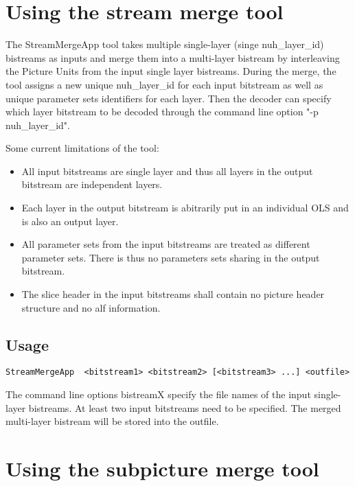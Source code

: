 \documentclass[a4paper,11pt]{jvetdoc}
\begin{document}
\section{Using the stream merge tool}
\label{sec:stream-merge-tool}

The StreamMergeApp tool takes multiple single-layer (singe nuh_layer_id) bistreams 
as inputs and merge them into a multi-layer bistream by interleaving the Picture Units
from the input single layer bistreams. During the merge, the tool assigns a new unique
nuh_layer_id for each input bitstream as well as unique parameter sets identifiers for each layer.
Then the decoder can specify which layer bitstream to be decoded through the command line option "-p nuh_layer_id".

Some current limitations of the tool:
\begin{itemize}
\item All input bitstreams are single layer and thus all layers in the output bitstream are independent layers.
\item Each layer in the output bitstream is abitrarily put in an individual OLS and is also an output layer.
\item All parameter sets from the input bitstreams are treated as different parameter sets. There is thus no parameters sets sharing in the output bitstream.
\item The slice header in the input bitstreams shall contain no picture header structure and no alf information.
\end{itemize}


\subsection{Usage}
\label{sec:stream-merge-usage}

\begin{verbatim}
StreamMergeApp 	<bitstream1> <bitstream2> [<bitstream3> ...] <outfile>
\end{verbatim}

The command line options bistreamX specify the file names of the input single-layer 
bistreams. At least two input bitstreams need to be specified. The merged multi-layer 
bistream will be stored into the outfile.




\section{Using the subpicture merge tool}
\label{sec:subpicture-merge-tool}
\end{document}
